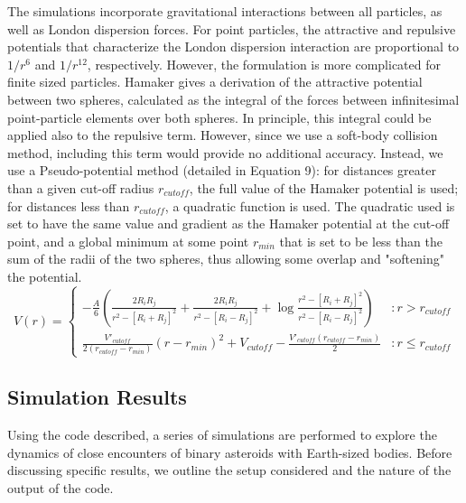 \documentclass[letterpaper, preprint, paper,11pt]{AAS}	%
\begin{document}
The simulations incorporate gravitational interactions between all particles, as well as London dispersion forces. For point particles, the attractive and repulsive potentials that characterize the London dispersion interaction are proportional to ${1}/{r^6}$ and ${1}/{r^{12}}$, respectively. However, the formulation is more complicated for finite sized particles. Hamaker\cite{hamaker} gives a derivation of the attractive potential between two spheres, calculated as the integral of the forces between infinitesimal point-particle elements over both spheres. In principle, this integral could be applied also to the repulsive term. However, since we use a soft-body collision method, including this term would provide no additional accuracy. Instead, we use a Pseudo-potential method (detailed in Equation 9): for distances greater than a given cut-off radius $r_{cutoff}$, the full value of the Hamaker\cite{hamaker} potential is used; for distances less than $r_{cutoff}$, a quadratic function is used. The quadratic used is set to have the same value and gradient as the Hamaker\cite{hamaker} potential at the cut-off point, and a global minimum at some point $r_{min}$ that is set to be less than the sum of the radii of the two spheres, thus allowing some overlap and "softening" the potential. 
\begin{equation}
V(r) = \left\{
\begin{array}{lr}
-\frac{A}{6}\left(\frac{2R_iR_j}{r^2-[R_i+R_j]^2}+\frac{2R_iR_j}{r^2-[R_i-R_j]^2}+\log\frac{r^2-[R_i+R_j]^2}{r^2-[R_i-R_j]^2}\right) & : r > r_{cutoff}\\
\frac{V'_{cutoff}}{2(r_{cutoff}-r_{min})}(r-r_{min})^2+V_{cutoff} - \frac{V'_{cutoff}(r_{cutoff}-r_{min})}{2} & : r \leq r_{cutoff}
\end{array}
\right.
\end{equation}

\subsection{Simulation Results}

Using the code described, a series of simulations are performed to explore the dynamics of close encounters of binary asteroids with Earth-sized bodies. Before discussing specific results, we outline the setup considered and the nature of the output of the code.
\end{document}
